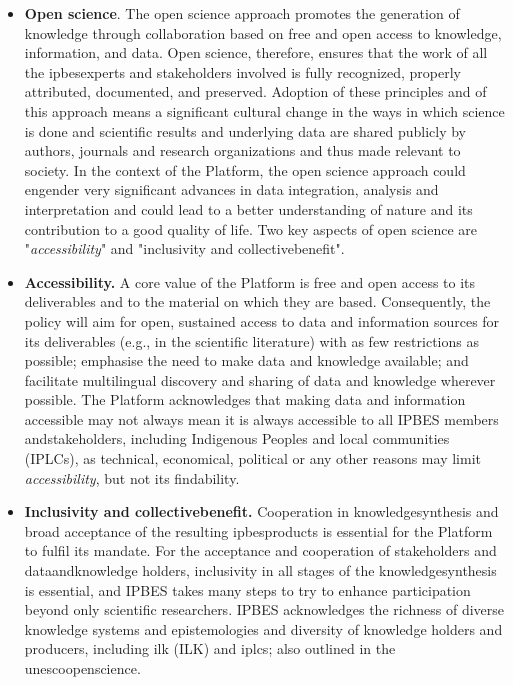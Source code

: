 \documentclass{article}
\begin{document}
\begin{itemize}
    \item \textbf{Open science}. The open science approach promotes the generation of \gls{knowledge} through collaboration based on free and open access to \gls{knowledge}, information, and \gls{data}. Open science, therefore, ensures that the work of all the \glspl{ipbesexpert} and \glspl{stakeholder} involved is fully recognized, properly attributed, documented, and preserved. Adoption of these principles and of this approach means a significant cultural change in the ways in which science is done and scientific results and underlying \gls{data} are shared publicly by authors, journals and research organizations and thus made relevant to society. In the context of the Platform, the open science approach could engender very significant advances in \gls{data} integration, analysis and interpretation and could lead to a better understanding of nature and its contribution to a good quality of life. Two key aspects of open science are "\textit{accessibility}" and "inclusivity and \gls{collectivebenefit}".
    \item \textbf{Accessibility.} A core value of the Platform is free and open access to its deliverables and to the material on which they are based. Consequently, the policy will aim for open, sustained access to \gls{data} and information sources for its deliverables (e.g., in the scientific literature) with as few restrictions as possible; emphasise the need to make data and knowledge available;  and facilitate multilingual discovery and sharing of \gls{data} and knowledge wherever possible. The Platform acknowledges that making \gls{data} and information accessible may not always mean it is always accessible to all IPBES members and\glspl{stakeholder}, including Indigenous Peoples and local communities (IPLCs), as technical, economical, political or any other reasons may limit \textit{accessibility}, but not its findability.
    \item \textbf{Inclusivity and \gls{collectivebenefit}.} Cooperation in \gls{knowledgesynthesis} and broad acceptance of the resulting \glspl{ipbesproduct} is essential for the Platform to fulfil its mandate. For the acceptance and cooperation of \glspl{stakeholder} and \gls{dataandknowledge} holders, inclusivity in all stages of the \gls{knowledgesynthesis} is essential, and IPBES takes many steps to try to enhance participation beyond only scientific researchers. IPBES acknowledges the richness of diverse knowledge systems and epistemologies and diversity of knowledge holders and producers, including \gls{ilk} (ILK) and \glspl{iplc}; also outlined in the \gls{unescoopenscience}.
\end{itemize}
\end{document}

